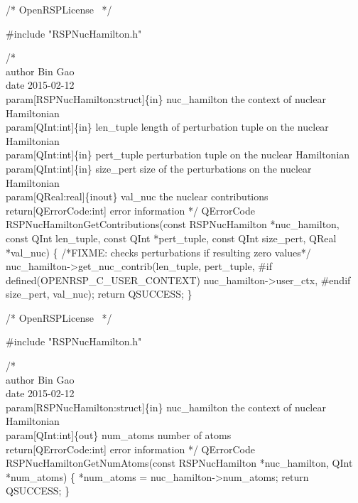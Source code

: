 \nwendcode{}\endmoddef
/*
  \LA{}OpenRSPLicense~{\nwtagstyle{}}\RA{}
*/

#include "RSPNucHamilton.h"

/*%
    \\author Bin Gao
    \\date 2015-02-12
    \\param[RSPNucHamilton:struct]\{in\} nuc_hamilton the context of nuclear Hamiltonian
    \\param[QInt:int]\{in\} len_tuple length of perturbation tuple on the nuclear Hamiltonian
    \\param[QInt:int]\{in\} pert_tuple perturbation tuple on the nuclear Hamiltonian
    \\param[QInt:int]\{in\} size_pert size of the perturbations on the nuclear Hamiltonian
    \\param[QReal:real]\{inout\} val_nuc the nuclear contributions
    \\return[QErrorCode:int] error information
*/
QErrorCode RSPNucHamiltonGetContributions(const RSPNucHamilton *nuc_hamilton,
                                          const QInt len_tuple,
                                          const QInt *pert_tuple,
                                          const QInt size_pert,
                                          QReal *val_nuc)
\{
/*FIXME: checks perturbations if resulting zero values*/
    nuc_hamilton->get_nuc_contrib(len_tuple,
                                  pert_tuple,
#if defined(OPENRSP_C_USER_CONTEXT)
                                  nuc_hamilton->user_ctx,
#endif
                                  size_pert,
                                  val_nuc);
    return QSUCCESS;
\}

\nwendcode{}\endmoddef
/*
  \LA{}OpenRSPLicense~{\nwtagstyle{}}\RA{}
*/

#include "RSPNucHamilton.h"

/*%
    \\author Bin Gao
    \\date 2015-02-12
    \\param[RSPNucHamilton:struct]\{in\} nuc_hamilton the context of nuclear Hamiltonian
    \\param[QInt:int]\{out\} num_atoms number of atoms
    \\return[QErrorCode:int] error information
*/
QErrorCode RSPNucHamiltonGetNumAtoms(const RSPNucHamilton *nuc_hamilton,
                                     QInt *num_atoms)
\{
    *num_atoms = nuc_hamilton->num_atoms;
    return QSUCCESS;
\}

